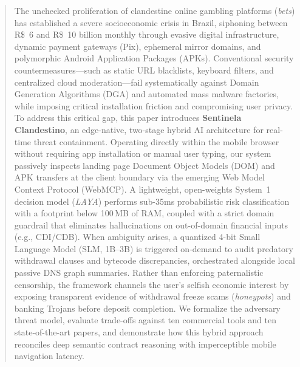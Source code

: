 \documentclass[runningheads]{llncs}
\begin{document}
\begin{abstract}
The unchecked proliferation of clandestine online gambling platforms (\textit{bets}) has established a severe socioeconomic crisis in Brazil, siphoning between R\$~6 and R\$~10 billion monthly through evasive digital infrastructure, dynamic payment gateways (Pix), ephemeral mirror domains, and polymorphic Android Application Packages (APKs). Conventional security countermeasures---such as static URL blacklists, keyboard filters, and centralized cloud moderation---fail systematically against Domain Generation Algorithms (DGA) and automated mass malware factories, while imposing critical installation friction and compromising user privacy. To address this critical gap, this paper introduces \textbf{Sentinela Clandestino}, an edge-native, two-stage hybrid AI architecture for real-time threat containment. Operating directly within the mobile browser without requiring app installation or manual user typing, our system passively inspects landing page Document Object Models (DOM) and APK transfers at the client boundary via the emerging Web Model Context Protocol (WebMCP). A lightweight, open-weights System~1 decision model (\textit{LAYA}) performs sub-35ms probabilistic risk classification with a footprint below 100\,MB of RAM, coupled with a strict domain guardrail that eliminates hallucinations on out-of-domain financial inputs (e.g., CDI/CDB). When ambiguity arises, a quantized 4-bit Small Language Model (SLM, 1B--3B) is triggered on-demand to audit predatory withdrawal clauses and bytecode discrepancies, orchestrated alongside local passive DNS graph summaries. Rather than enforcing paternalistic censorship, the framework channels the user's selfish economic interest by exposing transparent evidence of withdrawal freeze scams (\textit{honeypots}) and banking Trojans before deposit completion. We formalize the adversary threat model, evaluate trade-offs against ten commercial tools and ten state-of-the-art papers, and demonstrate how this hybrid approach reconciles deep semantic contract reasoning with imperceptible mobile navigation latency.

\end{abstract}










\end{document}

